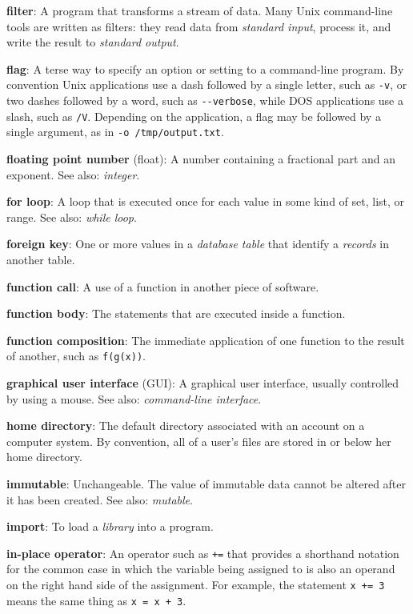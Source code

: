 \documentclass[]{book}
\newcommand{\gdef}[2]{\emph{#2}}
\begin{document}
\textbf{filter}: A program that transforms a stream of data. Many Unix
command-line tools are written as filters: they read data from
\gdef{g:standard-input}{standard input}, process it, and write the
result to \gdef{g:standard-output}{standard output}.

\textbf{flag}: A terse way to specify an option or setting to a
command-line program. By convention Unix applications use a dash
followed by a single letter, such as \texttt{-v}, or two dashes followed
by a word, such as \texttt{-{}-verbose}, while DOS applications use a
slash, such as \texttt{/V}. Depending on the application, a flag may be
followed by a single argument, as in \texttt{-o /tmp/output.txt}.

\textbf{floating point number} (float): A number containing a fractional
part and an exponent. See also: \gdef{g:integer}{integer}.

\textbf{for loop}: A loop that is executed once for each value in some
kind of set, list, or range. See also: \gdef{g:while-loop}{while
loop}.

\textbf{foreign key}: One or more values in a
\gdef{g:table-database}{database table} that identify a
\gdef{g:record-database}{records} in another table.

\textbf{function call}: A use of a function in another piece of
software.

\textbf{function body}: The statements that are executed inside a
function.

\textbf{function composition}: The immediate application of one function
to the result of another, such as \texttt{f(g(x))}.

\textbf{graphical user interface} (GUI): A graphical user interface,
usually controlled by using a mouse. See also:
\gdef{g:cli}{command-line interface}.

\textbf{home directory}: The default directory associated with an
account on a computer system. By convention, all of a user's files are
stored in or below her home directory.

\textbf{immutable}: Unchangeable. The value of immutable data cannot be
altered after it has been created. See also:
\gdef{g:mutable}{mutable}.

\textbf{import}: To load a \gdef{g:library}{library} into a program.

\textbf{in-place operator}: An operator such as \texttt{+=} that
provides a shorthand notation for the common case in which the variable
being assigned to is also an operand on the right hand side of the
assignment. For example, the statement \texttt{x += 3} means the same
thing as \texttt{x = x + 3}.
\end{document}
